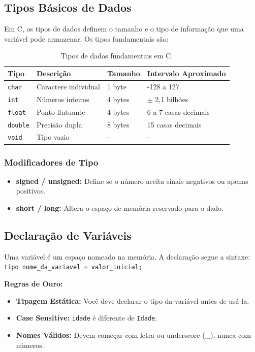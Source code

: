 \documentclass{article}
\begin{document}
\subsection{Tipos Básicos de Dados}

Em C, os tipos de dados definem o tamanho e o tipo de informação que uma variável pode armazenar. Os tipos fundamentais são:

\begin{table}[h]
\centering
\begin{tabular}{|l|l|l|l|}
\hline
\textbf{Tipo} & \textbf{Descrição} & \textbf{Tamanho} & \textbf{Intervalo Aproximado} \\ \hline
\texttt{char} & Caractere individual & 1 byte & -128 a 127 \\ \hline
\texttt{int} & Números inteiros & 4 bytes & $\pm$ 2,1 bilhões \\ \hline
\texttt{float} & Ponto flutuante & 4 bytes & 6 a 7 casas decimais \\ \hline
\texttt{double} & Precisão dupla & 8 bytes & 15 casas decimais \\ \hline
\texttt{void} & Tipo vazio & - & - \\ \hline
\end{tabular}
\caption{Tipos de dados fundamentais em C.}
\end{table}

\subsubsection*{Modificadores de Tipo}

\begin{itemize}
    \item \textbf{signed / unsigned:} Define se o número aceita sinais negativos ou apenas positivos.
    \item \textbf{short / long:} Altera o espaço de memória reservado para o dado.
\end{itemize}

\subsection{Declaração de Variáveis}

Uma variável é um espaço nomeado na memória. A declaração segue a sintaxe:
\texttt{tipo nome\_da\_variavel = valor\_inicial;}

\textbf{Regras de Ouro:}
\begin{itemize}
    \item \textbf{Tipagem Estática:} Você deve declarar o tipo da variável antes de usá-la.
    \item \textbf{Case Sensitive:} \texttt{idade} é diferente de \texttt{Idade}.
    \item \textbf{Nomes Válidos:} Devem começar com letra ou underscore (\_), nunca com números.
\end{itemize}
\end{document}
